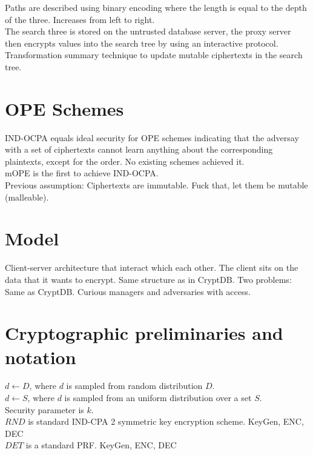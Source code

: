 \documentclass[10pt]{article}
\begin{document}
Paths are described using binary encoding where the length is equal to the depth of the three. Increases from left to right.\\

The search three is stored on the untrusted database server, the proxy server then encrypts values into the search tree by using an interactive protocol.\\

Transformation summary technique to update mutable ciphertexts in the search tree.\\

\section{OPE Schemes}

IND-OCPA equals ideal security for OPE schemes indicating that the adversay with a set of ciphertexts cannot learn anything about the corresponding plaintexts, except for the order. No existing schemes achieved it.\\

mOPE is the first to achieve IND-OCPA.\\

Previous assumption: Ciphertexts are immutable. Fuck that, let them be mutable (malleable). 

\section{Model}

Client-server architecture that interact which each other. The client sits on the data that it wants to encrypt. Same structure as in CryptDB. Two problems: Same as CryptDB. Curious managers and adversaries with access.\\

\section{Cryptographic preliminaries and notation}

$d \leftarrow D$, where $d$ is sampled from random distribution $D$.\\
$d \leftarrow S$, where $d$ is sampled from an uniform distribution over a set $S$.\\
Security parameter is $k$.\\
$RND$ is standard IND-CPA 2 symmetric key encryption scheme. KeyGen, ENC, DEC\\
$DET$ is a standard PRF. KeyGen, ENC, DEC\\
\end{document}
